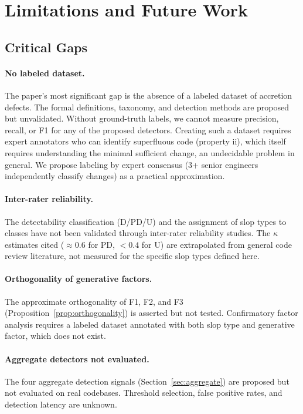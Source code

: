 \documentclass[11pt, a4paper, logo, copyright]{googledeepmind}
\begin{document}
\section{Limitations and Future Work}
\label{sec:limitations}

\subsection{Critical Gaps}

\paragraph{No labeled dataset.} The paper's most significant gap is the absence of a labeled dataset of accretion defects. The formal definitions, taxonomy, and detection methods are proposed but unvalidated. Without ground-truth labels, we cannot measure precision, recall, or F1 for any of the proposed detectors. Creating such a dataset requires expert annotators who can identify superfluous code (property ii), which itself requires understanding the minimal sufficient change, an undecidable problem in general. We propose labeling by expert consensus (3+ senior engineers independently classify changes) as a practical approximation.

\paragraph{Inter-rater reliability.} The detectability classification (D/PD/U) and the assignment of slop types to classes have not been validated through inter-rater reliability studies. The $\kappa$ estimates cited ($\approx 0.6$ for PD, $< 0.4$ for U) are extrapolated from general code review literature, not measured for the specific slop types defined here.

\paragraph{Orthogonality of generative factors.} The approximate orthogonality of F1, F2, and F3 (Proposition~\ref{prop:orthogonality}) is asserted but not tested. Confirmatory factor analysis requires a labeled dataset annotated with both slop type and generative factor, which does not exist.

\paragraph{Aggregate detectors not evaluated.} The four aggregate detection signals (Section~\ref{sec:aggregate}) are proposed but not evaluated on real codebases. Threshold selection, false positive rates, and detection latency are unknown.
\end{document}
